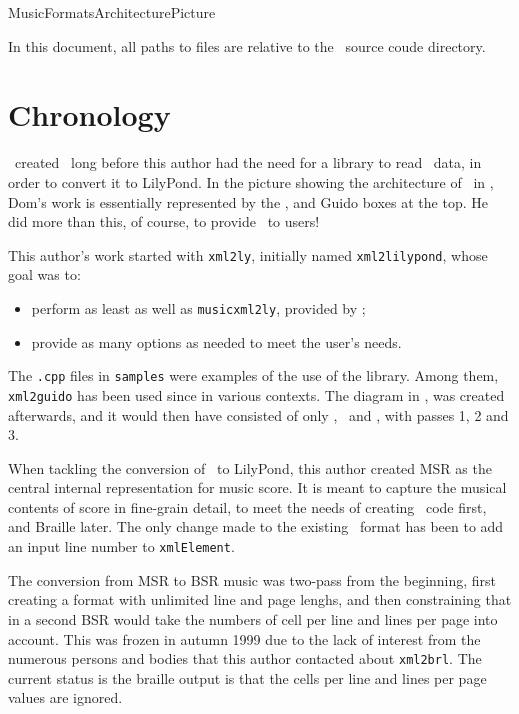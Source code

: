 {MusicFormatsArchitecturePicture}

In this document, all paths to files are relative to the \mf\ source coude directory.


\section{Chronology}

\fober\ created \libmusicxml\ long before this author had the need for a library to read \mxml\ data, in order to convert it to LilyPond.
In the picture showing the architecture of \mf\ in , Dom's work is essentially represented by the \mxml, \mxsrRepr and Guido boxes at the top. He did more than this, of course, to provide \libmusicxml\ to users!

This author's work started with {\tt xml2ly}, initially named {\tt xml2lilypond}, whose goal was to:
\begin{itemize}
\item perform as least as well as {\tt musicxml2ly}, provided by \lily;
\item provide as many options as needed to meet the user's needs.
\end{itemize}


The {\tt *.cpp} files in {\tt samples} were examples of the use of the library. Among them, {\tt xml2guido} has been used since in various contexts.
The diagram in , was created afterwards, and it would then have consisted of only \mxml, \mxsrRepr\ and \guido, with passes 1, 2 and 3.

When tackling the conversion of \mxml\ to LilyPond, this author created MSR as the central internal representation for music score. It is meant to capture the musical contents of score in fine-grain detail, to meet the needs of creating \lily\ code first, and Braille later.
The only change made to the existing \mxsrRepr\ format has been to add an input line number to {\tt xmlElement}.

The conversion from MSR to BSR music was two-pass from the beginning, first creating a \bsrRepr format with unlimited line and page lenghs, and then constraining that in a second BSR would take the numbers of cell per line and lines per page into account.
This was frozen in autumn 1999 due to the lack of interest from the numerous persons and bodies that this author contacted about {\tt xml2brl}.
The current status is the braille output is that the cells per line and lines per page values are ignored.


